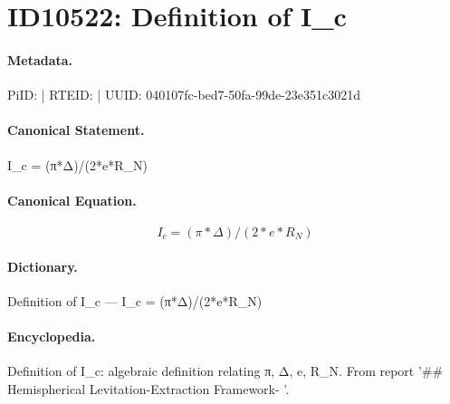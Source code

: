 \section*{ID10522: Definition of I\_c}
\paragraph{Metadata.}
PiID:  | RTEID:  | UUID: 040107fc-bed7-50fa-99de-23e351c3021d

\paragraph{Canonical Statement.}
I\_c = (π*Δ)/(2*e*R\_N)

\paragraph{Canonical Equation.}
\[
I_c = (π*Δ)/(2*e*R_N)
\]

\paragraph{Dictionary.}
Definition of I\_c — I\_c = (π*Δ)/(2*e*R\_N)

\paragraph{Encyclopedia.}
Definition of I\_c: algebraic definition relating π, Δ, e, R\_N. From report '\#\# Hemispherical Levitation-Extraction Framework- '.
